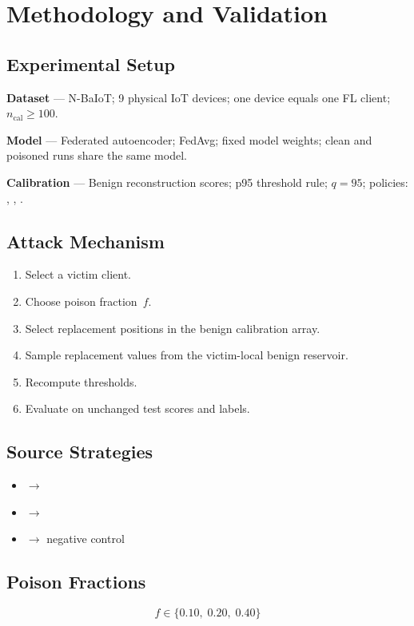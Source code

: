 
\section{Methodology and Validation}

\subsection{Experimental Setup}

\textbf{Dataset} — N-BaIoT; 9 physical IoT devices; one device equals one FL client;
$n_{\text{cal}} \geq 100$.

\textbf{Model} — Federated autoencoder; FedAvg; fixed model weights; clean and poisoned
runs share the same model.

\textbf{Calibration} — Benign reconstruction scores; p95 threshold rule; $q = 95$;
policies: , , .

\subsection{Attack Mechanism}

\begin{enumerate}
  \item Select a victim client.
  \item Choose poison fraction~$f$.
  \item Select replacement positions in the benign calibration array.
  \item Sample replacement values from the victim-local benign reservoir.
  \item Recompute thresholds.
  \item Evaluate on unchanged test scores and labels.
\end{enumerate}

\vspace{0.2em}
\begin{minipage}[t]{0.54\linewidth}
\subsection{Source Strategies}
\begin{itemize}
  \item {} $\to$ 
  \item {} $\to$ 
  \item {} $\to$ negative control
\end{itemize}
\end{minipage}%
\hfill
\begin{minipage}[t]{0.42\linewidth}
\subsection{Poison Fractions}
\[f \in \{0.10,\; 0.20,\; 0.40\}\]
\end{minipage}

